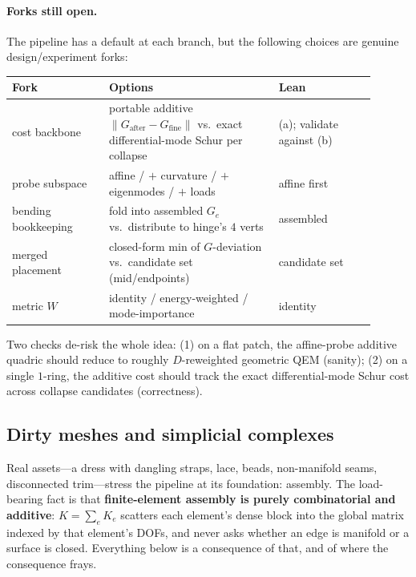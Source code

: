 \paragraph{Forks still open.}
The pipeline has a default at each branch, but the following choices are genuine design/experiment forks:
\begin{center}
\renewcommand{\arraystretch}{1.3}
\begin{tabular}{|p{0.24\linewidth}|p{0.42\linewidth}|p{0.24\linewidth}|}
\hline
\textbf{Fork} & \textbf{Options} & \textbf{Lean} \\
\hline
cost backbone & portable additive $\|G_{\text{after}}-G_{\text{fine}}\|$ vs.\ exact
  differential-mode Schur per collapse & (a); validate against (b) \\
\hline
probe subspace & affine / $+$ curvature / $+$ eigenmodes / $+$ loads & affine first \\
\hline
bending bookkeeping & fold into assembled $G_e$ vs.\ distribute to hinge's $4$ verts & assembled \\
\hline
merged placement & closed-form min of $G$-deviation vs.\ candidate set (mid/endpoints) & candidate set \\
\hline
metric $W$ & identity / energy-weighted / mode-importance & identity \\
\hline
\end{tabular}
\end{center}
Two checks de-risk the whole idea: (1) on a flat patch, the affine-probe additive quadric should reduce to roughly $D$-reweighted geometric QEM (sanity); (2) on a single $1$-ring, the additive cost should track the exact differential-mode Schur cost across collapse candidates (correctness).

\subsection{Dirty meshes and simplicial complexes}

Real assets---a dress with dangling straps, lace, beads, non-manifold seams, disconnected trim---stress the pipeline at its foundation: assembly.
The load-bearing fact is that \textbf{finite-element assembly is purely combinatorial and additive}: $K = \sum_e K_e$ scatters each element's dense block into the global matrix indexed by that element's DOFs, and never asks whether an edge is manifold or a surface is closed.
Everything below is a consequence of that, and of where the consequence frays.

